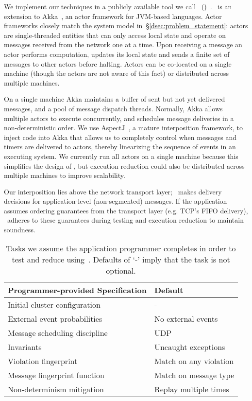 We implement our techniques in a publicly available tool we call \sys~(\system)~\cite{our_repo}. \sys~is an extension
to Akka~\cite{akka}, an actor
framework for JVM-based languages.
Actor frameworks closely match the system model in~\S\ref{dsec:problem_statement}: actors
are single-threaded entities that can only access local state and operate on messages
received from the network one at a time. Upon receiving a message an actor performs computation,
updates its local state and sends a finite set of messages to other actors
before halting. Actors can be co-located
on a single machine (though the actors are not aware of this fact) or distributed across multiple machines.

On a single machine Akka maintains a buffer of sent but not yet delivered
messages, and a pool of message dispatch threads.
Normally, Akka allows multiple actors to execute
concurrently, and schedules message deliveries in a
non-deterministic order. We use AspectJ~\cite{kiczales2001overview}, a mature interposition framework,
to inject code into Akka that allows us to completely control when messages
and timers are
delivered to actors, thereby linearizing the sequence of events in an executing system.
We currently run all actors on a single machine because this simplifies the
design of \sys,
but execution reduction could also be distributed across multiple machines to improve
scalability.

Our interposition lies above the network transport layer; \sys~makes
delivery decisions for application-level (non-segmented) messages.
If the application assumes ordering guarantees from the transport
layer (e.g. TCP's FIFO delivery), \sys~adheres to these guarantees
during testing and execution reduction to maintain soundness.

\begin{table}[tb]
\centering
\begin{tabular}{l|l}
\textbf{Programmer-provided Specification} & \textbf{Default} \\
\hline
Initial cluster configuration & - \\
External event probabilities & No external events \\
Message scheduling discipline & UDP \\
Invariants & Uncaught exceptions \\
Violation fingerprint & Match on any violation \\
Message fingerprint function & Match on message type \\
Non-determinism mitigation & Replay multiple times
\end{tabular}
\caption{\label{tab:programmer_tasks} Tasks we assume the application
programmer completes in order to test and reduce using~\sys. Defaults
of `-' imply that the task is not optional.}
\end{table}

